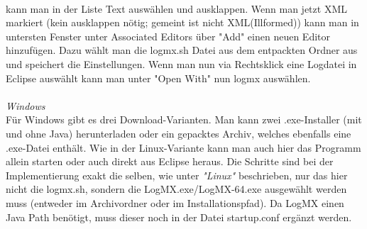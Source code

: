 \\kann man in der Liste Text auswählen und ausklappen. Wenn man jetzt XML markiert (kein ausklappen nötig; gemeint ist nicht XML(Illformed)) kann man in untersten Fenster unter Associated Editors über "Add" einen neuen Editor hinzufügen. Dazu wählt man die logmx.sh Datei aus dem entpackten Ordner aus und speichert die Einstellungen. Wenn man nun via Rechtsklick eine Logdatei in Eclipse auswählt kann man unter "Open With" nun logmx auswählen.\\\\
\emph{Windows}
\\
Für Windows gibt es drei Download-Varianten. Man kann zwei .exe-Installer (mit und ohne Java) herunterladen oder ein gepacktes Archiv, welches ebenfalls eine .exe-Datei enthält. Wie in der Linux-Variante kann man auch hier das Programm allein starten oder auch direkt aus Eclipse heraus. Die Schritte sind bei der Implementierung exakt die selben, wie unter \textit{"Linux"} beschrieben, nur das hier nicht die logmx.sh, sondern die LogMX.exe/LogMX-64.exe ausgewählt werden muss (entweder im Archivordner oder im Installationspfad).
Da LogMX einen Java Path benötigt, muss dieser noch in der Datei startup.conf ergänzt werden.
\nsecend %
\nsecend %

